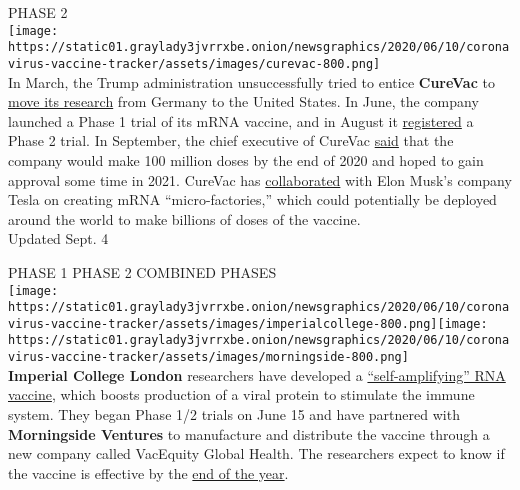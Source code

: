 PHASE 2\\
\texttt{[image: https://static01.graylady3jvrrxbe.onion/newsgraphics/2020/06/10/coronavirus-vaccine-tracker/assets/images/curevac-800.png]}\\
In March, the Trump administration unsuccessfully tried to entice
\textbf{CureVac} to
\href{https://www.nytimes3xbfgragh.onion/2020/03/15/world/europe/cornonavirus-vaccine-us-germany.html}{move
its research} from Germany to the United States. In June, the company
launched a Phase 1 trial of its mRNA vaccine, and in August it
\href{https://clinicaltrials.gov/ct2/show/NCT04515147?term=vaccine\&recrs=abdf\&cond=COVID-19\&phase=0123\&sort=nwst\&draw=2\&rank=1}{registered}
a Phase 2 trial. In September, the chief executive of CureVac
\href{https://www.handelsblatt.com/unternehmen/management/der-risikoinvestor-dietmar-hopp-will-mit-curevac-rennen-um-besten-impfstoff-gewinnen/26154156.html}{said}
that the company would make 100 million doses by the end of 2020 and
hoped to gain approval some time in 2021. CureVac has
\href{https://observer.com/2020/09/tesla-elon-musk-germany-covid19-vaccine-collaboration-curevac/}{collaborated}
with Elon Musk's company Tesla on creating mRNA ``micro-factories,''
which could potentially be deployed around the world to make billions of
doses of the vaccine.\\
Updated Sept. 4

PHASE 1 PHASE 2 COMBINED PHASES\\
\texttt{[image: https://static01.graylady3jvrrxbe.onion/newsgraphics/2020/06/10/coronavirus-vaccine-tracker/assets/images/imperialcollege-800.png]}\texttt{[image: https://static01.graylady3jvrrxbe.onion/newsgraphics/2020/06/10/coronavirus-vaccine-tracker/assets/images/morningside-800.png]}\\
\textbf{Imperial College London} researchers have developed a
\href{https://www.nytimes3xbfgragh.onion/2020/06/07/world/europe/imperial-college-uk-vaccine-coronavirus.html}{``self-amplifying''
RNA vaccine}, which boosts production of a viral protein to stimulate
the immune system. They began Phase 1/2 trials on June 15 and have
partnered with \textbf{Morningside Ventures} to manufacture and
distribute the vaccine through a new company called VacEquity Global
Health. The researchers expect to know if the vaccine is effective by
the
\href{https://www.theguardian.com/society/2020/jul/03/im-cautiously-optimistic-imperials-robin-shattock-on-his-coronavirus-vaccine}{end
of the year}.

